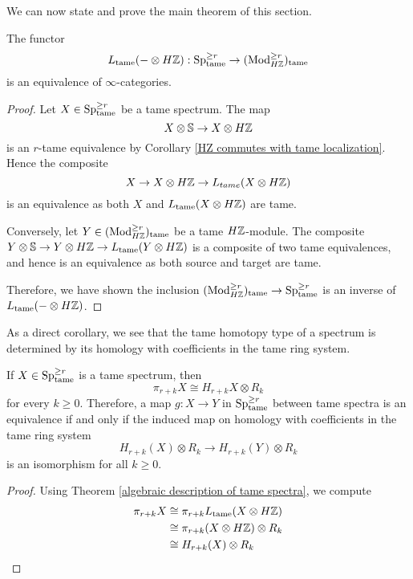We can now state and prove the main theorem of this section.
\begin{theorem}
	\label{algebraic description of tame spectra}
	The functor
	$$
	L_{\operatorname{\operatorname{tame}}}(-\otimes H{\mathbb{Z}}):
	\operatorname{Sp}^{\geq r}_{\operatorname{\operatorname{tame}}} \to (\operatorname{Mod}^{\geq r}_{H{\mathbb{Z}}})_{\operatorname{\operatorname{tame}}}
	$$
	is an equivalence of $\infty$-categories.
\end{theorem}
\begin{proof}
	Let $X\in \operatorname{Sp}^{\geq r}_{\operatorname{\operatorname{tame}}}$ be a tame spectrum. The map 
	$$
	X\otimes {\mathbb{S}} \to X\otimes H{\mathbb{Z}}
	$$ is an $r$-tame equivalence by Corollary \ref{HZ commutes with tame localization}. Hence the composite 
	$$
	X \to X\otimes H{\mathbb{Z}} \to L_{tame}(X\otimes H{\mathbb{Z}})
	$$ is an equivalence as both $X$ and $L_{\operatorname{\operatorname{tame}}}(X\otimes H{\mathbb{Z}})$ are tame.
	
	Conversely, let $Y\in (\operatorname{Mod}^{\geq r}_{H{\mathbb{Z}}})_{\operatorname{\operatorname{tame}}}$ be a tame $H{\mathbb{Z}}$-module. The composite $Y\otimes {\mathbb{S}} \to  Y\otimes H{\mathbb{Z}} \to L_{\operatorname{\operatorname{tame}}}(Y\otimes H{\mathbb{Z}})$ is a composite of two tame equivalences, and hence is an equivalence as both source and target are tame.
	
	Therefore, we have shown the inclusion 
	$
	(\operatorname{Mod}^{\geq r}_{H{\mathbb{Z}}})_{\operatorname{\operatorname{tame}}} 
	\to 
	\operatorname{Sp}^{\geq r}_{\operatorname{\operatorname{tame}}}
	$
	is an inverse of $L_{\operatorname{\operatorname{tame}}}(-\otimes H{\mathbb{Z}})$.
	
	\end{proof}
	

As a direct corollary, we see that the tame homotopy type of a spectrum is determined by its homology with coefficients in the tame ring system.
\begin{corollary}
\label{htpy groups of tame spectra can be computed by homology}
	If $X\in \operatorname{Sp}^{\geq r}_{\operatorname{\operatorname{tame}}}$ is a tame spectrum, then 
	\[
	\pi_{r+k}X \cong H_{r+k}X \otimes R_k
	\]
	for every $k\geq 0$. Therefore, a map $g:X\to Y$ in $\operatorname{Sp}^{\geq r}_{\operatorname{\operatorname{tame}}}$ between tame spectra is an equivalence if and only if the induced map on homology with coefficients in the tame ring system
	$$
	H_{r+k}(X)\otimes R_k \to H_{r+k}(Y)\otimes R_k
	$$ 
	is an isomorphism for all $k\geq 0$.    
\end{corollary}
	
\begin{proof}
	Using Theorem \ref{algebraic description of tame spectra}, we compute
	\begin{align*}
		\pi_{r+k}X  &\cong \pi_{r+k}L_{\operatorname{\operatorname{tame}}}(X\otimes H{\mathbb{Z}})\\
		& \cong \pi_{r+k}(X\otimes H{\mathbb{Z}})\otimes R_k\\
		& \cong H_{r+k}(X)\otimes R_k
	\end{align*}
\end{proof}

